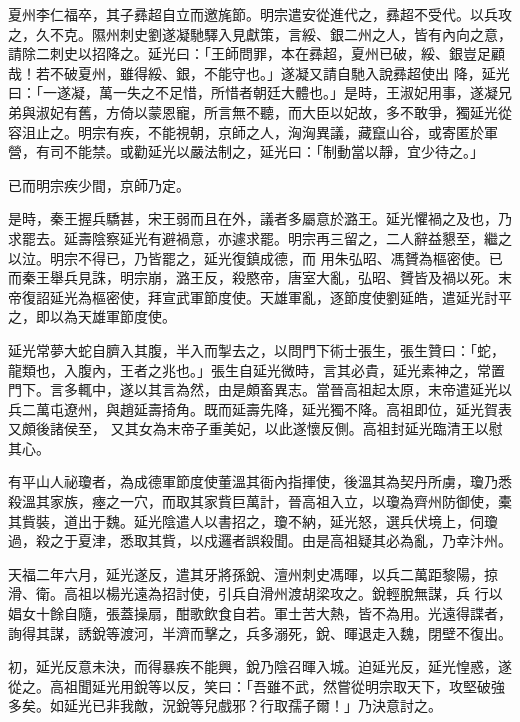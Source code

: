 \begin{pinyinscope}
 夏州李仁福卒，其子彞超自立而邀旄節。明宗遣安從進代之，彞超不受代。以兵攻之，久不克。隰州刺史劉遂凝馳驛入見獻策，言綏、銀二州之人，皆有內向之意，請除二刺史以招降之。延光曰：「王師問罪，本在彞超，夏州已破，綏、銀豈足顧哉！若不破夏州，雖得綏、銀，不能守也。」遂凝又請自馳入說彞超使出
 降，延光曰：「一遂凝，萬一失之不足惜，所惜者朝廷大體也。」是時，王淑妃用事，遂凝兄弟與淑妃有舊，方倚以蒙恩寵，所言無不聽，而大臣以妃故，多不敢爭，獨延光從容沮止之。明宗有疾，不能視朝，京師之人，洶洶異議，藏竄山谷，或寄匿於軍營，有司不能禁。或勸延光以嚴法制之，延光曰：「制動當以靜，宜少待之。」



 已而明宗疾少間，京師乃定。



 是時，秦王握兵驕甚，宋王弱而且在外，議者多屬意於潞王。延光懼禍之及也，乃求罷去。延壽陰察延光有避禍意，亦遽求罷。明宗再三留之，二人辭益懇至，繼之以泣。明宗不得已，乃皆罷之，延光復鎮成德，而
 用朱弘昭、馮贇為樞密使。已而秦王舉兵見誅，明宗崩，潞王反，殺愍帝，唐室大亂，弘昭、贇皆及禍以死。末帝復詔延光為樞密使，拜宣武軍節度使。天雄軍亂，逐節度使劉延皓，遣延光討平之，即以為天雄軍節度使。



 延光常夢大蛇自臍入其腹，半入而掣去之，以問門下術士張生，張生贊曰：「蛇，龍類也，入腹內，王者之兆也。」張生自延光微時，言其必貴，延光素神之，常置門下。言多輒中，遂以其言為然，由是頗畜異志。當晉高祖起太原，末帝遣延光以兵二萬屯遼州，與趙延壽掎角。既而延壽先降，延光獨不降。高祖即位，延光賀表又頗後諸侯至，
 又其女為末帝子重美妃，以此遂懷反側。高祖封延光臨清王以慰其心。



 有平山人祕瓊者，為成德軍節度使董溫其衙內指揮使，後溫其為契丹所虜，瓊乃悉殺溫其家族，瘞之一穴，而取其家貲巨萬計，晉高祖入立，以瓊為齊州防御使，橐其貲裝，道出于魏。延光陰遣人以書招之，瓊不納，延光怒，選兵伏境上，伺瓊過，殺之于夏津，悉取其貲，以戍邏者誤殺聞。由是高祖疑其必為亂，乃幸汴州。



 天福二年六月，延光遂反，遣其牙將孫銳、澶州刺史馮暉，以兵二萬距黎陽，掠滑、衛。高祖以楊光遠為招討使，引兵自滑州渡胡梁攻之。銳輕脫無謀，兵
 行以娼女十餘自隨，張蓋操扇，酣歌飲食自若。軍士苦大熱，皆不為用。光遠得諜者，詢得其謀，誘銳等渡河，半濟而擊之，兵多溺死，銳、暉退走入魏，閉壁不復出。



 初，延光反意未決，而得暴疾不能興，銳乃陰召暉入城。迫延光反，延光惶惑，遂從之。高祖聞延光用銳等以反，笑曰：「吾雖不武，然嘗從明宗取天下，攻堅破強多矣。如延光已非我敵，況銳等兒戲邪？行取孺子爾！」乃決意討之。




\end{pinyinscope}
